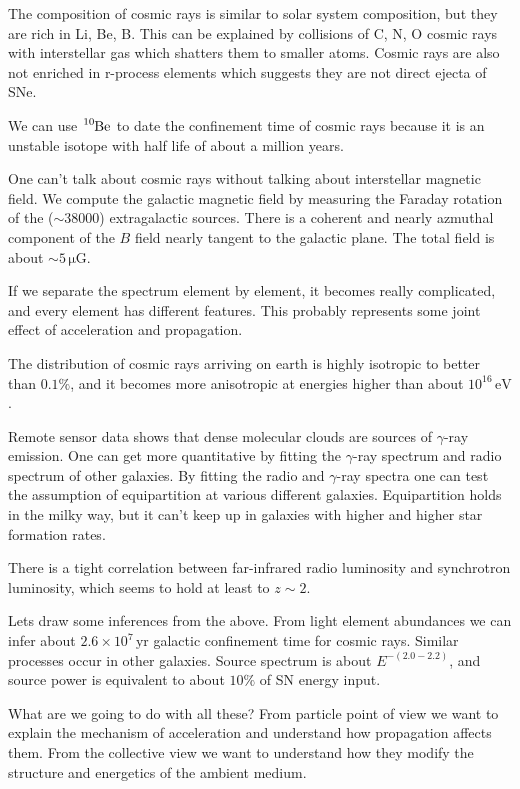 \documentclass[letterpaper, 11pt]{article}
\numberwithin{equation}{section}
\numberwithin{figure}{section}
\begin{document}
The composition of cosmic rays is similar to solar system composition, but they
are rich in Li, Be, B. This can be explained by collisions of C, N, O cosmic
rays with interstellar gas which shatters them to smaller atoms. Cosmic rays are
also not enriched in r-process elements which suggests they are not direct
ejecta of SNe.

We can use $\tensor[^{10}]{\mathrm{Be}}{}$ to date the confinement time of
cosmic rays because it is an unstable isotope with half life of about a million
years.

One can't talk about cosmic rays without talking about interstellar magnetic
field. We compute the galactic magnetic field by measuring the Faraday
rotation of the ($\sim 38000$) extragalactic sources. There is a coherent and
nearly azmuthal component of the $B$ field nearly tangent to the galactic plane.
The total field is about $\sim 5\,\mathrm{\mu G}$.

If we separate the spectrum element by element, it becomes really complicated,
and every element has different features. This probably represents some joint
effect of acceleration and propagation.

The distribution of cosmic rays arriving on earth is highly isotropic to better
than $0.1\%$, and it becomes more anisotropic at energies higher than about
$10^{16}\,\mathrm{eV}$.

Remote sensor data shows that dense molecular clouds are sources of
$\gamma$-ray emission. One can get more quantitative by fitting the $\gamma$-ray
spectrum and radio spectrum of other galaxies. By fitting the radio and
$\gamma$-ray spectra one can test the assumption of equipartition at various
different galaxies. Equipartition holds in the milky way, but it can't keep up
in galaxies with higher and higher star formation rates.

There is a tight correlation between far-infrared radio luminosity and
synchrotron luminosity, which seems to hold at least to $z \sim 2$.

Lets draw some inferences from the above. From light element abundances we can
infer about $2.6\times 10^7\,\mathrm{yr}$ galactic confinement time for cosmic
rays. Similar processes occur in other galaxies. Source spectrum is about
$E^{-(2.0-2.2)}$, and source power is equivalent to about $10\%$ of SN energy
input.

What are we going to do with all these? From particle point of view we want to
explain the mechanism of acceleration and understand how propagation affects
them. From the collective view we want to understand how they modify the
structure and energetics of the ambient medium.
\end{document}

